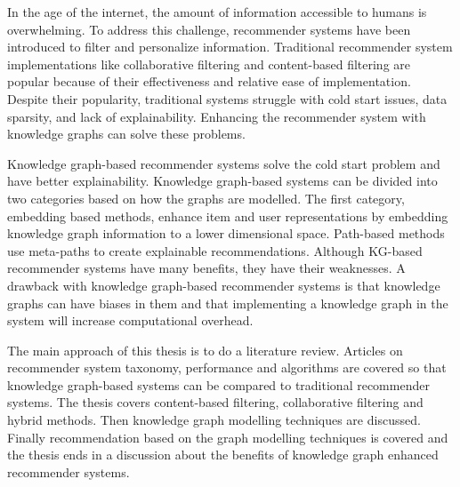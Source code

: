 \documentclass[english, 12pt, a4paper, sci, utf8, a-2b, online]{aaltothesis}
\date{\today}
\begin{document}

\makecoverpage

\clearpage

\begin{abstractpage}[english]
In the age of the internet, the amount of information accessible to humans is overwhelming. To address this challenge, recommender systems have been introduced to filter and personalize information. Traditional recommender system implementations like collaborative filtering and content-based filtering are popular because of their effectiveness and relative ease of implementation. Despite their popularity, traditional systems struggle with cold start issues, data sparsity, and lack of explainability. Enhancing the recommender system with knowledge graphs can solve these problems.

Knowledge graph-based recommender systems solve the cold start problem and have better explainability. Knowledge graph-based systems can be divided into two categories based on how the graphs are modelled. The first category, embedding based methods, enhance item and user representations by embedding knowledge graph information to a lower dimensional space. Path-based methods use meta-paths to create explainable recommendations. Although KG-based recommender systems have many benefits, they have their weaknesses. A drawback with knowledge graph-based recommender systems is that knowledge graphs can have biases in them and that implementing a knowledge graph in the system will increase computational overhead. 

The main approach of this thesis is to do a literature review. Articles on recommender system taxonomy, performance and algorithms are covered so that knowledge graph-based systems can be compared to traditional recommender systems. The thesis covers content-based filtering, collaborative filtering and hybrid methods. Then knowledge graph modelling techniques are discussed. Finally recommendation based on the graph modelling techniques is covered and the thesis ends in a discussion about the benefits of knowledge graph enhanced recommender systems.
\end{abstractpage}





\newpage

\date{}
\end{document}
